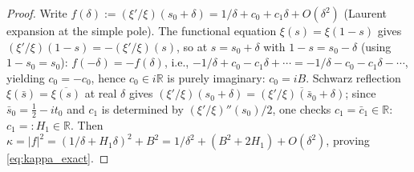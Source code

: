 \documentclass[11pt, a4paper]{article}
\theoremstyle{definition}
\theoremstyle{plain}
\begin{document}
\begin{proof}
Write $f(\delta) := (\xi'/\xi)(s_0+\delta) = 1/\delta + c_0 + c_1\delta + O(\delta^2)$
(Laurent expansion at the simple pole).
The functional equation $\xi(s) = \xi(1-s)$ gives $(\xi'/\xi)(1-s) = -(\xi'/\xi)(s)$,
so at $s = s_0 + \delta$ with $1 - s = s_0 - \delta$ (using $1-s_0 = s_0$):
$f(-\delta) = -f(\delta)$, i.e., $-1/\delta + c_0 - c_1\delta + \cdots = -1/\delta - c_0 - c_1\delta - \cdots$,
yielding $c_0 = -c_0$, hence $c_0 \in i\mathbb{R}$ is purely imaginary: $c_0 = iB$.
Schwarz reflection $\xi(\bar{s}) = \overline{\xi(s)}$ at real $\delta$ gives
$(\xi'/\xi)(s_0+\delta) = \overline{(\xi'/\xi)(\bar{s}_0 + \delta)}$;
since $\bar{s}_0 = \tfrac{1}{2} - it_0$ and $c_1$ is determined by $(\xi'/\xi)''(s_0)/2$,
one checks $c_1 = \bar{c}_1 \in \mathbb{R}$: $c_1 =: H_1 \in \mathbb{R}$.
Then $\kappa = |f|^2 = (1/\delta + H_1\delta)^2 + B^2 = 1/\delta^2 + (B^2 + 2H_1) + O(\delta^2)$,
proving \eqref{eq:kappa_exact}.
\end{proof}
\end{document}
